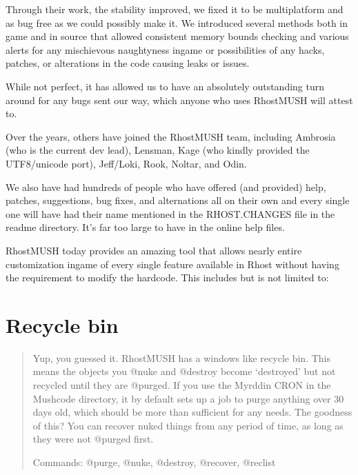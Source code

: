 \documentclass[letterpaper,10pt,english]{sphinxmanual}
\begin{document}
\sphinxAtStartPar
Through their work, the stability improved, we fixed it to be multi\sphinxhyphen{}platform
and as bug free as we could possibly make it.  We introduced several methods both
in game and in source that allowed consistent memory bounds checking and
various alerts for any mischievous naughtyness in\sphinxhyphen{}game or possibilities of any
hacks, patches, or alterations in the code causing leaks or issues.

\sphinxAtStartPar
While not perfect, it has allowed us to have an absolutely outstanding
turn around for any bugs sent our way, which anyone who uses RhostMUSH will
attest to.

\sphinxAtStartPar
Over the years, others have joined the RhostMUSH team, including Ambrosia
(who is the current dev lead), Lensman, Kage (who kindly provided the
UTF8/unicode port), Jeff/Loki, Rook, Noltar, and Odin.

\sphinxAtStartPar
We also have had hundreds of people who have offered (and provided) help,
patches, suggestions, bug fixes, and alternations all on their own and
every single one will have had their name mentioned in the RHOST.CHANGES
file in the readme directory.  It’s far too large to have in the online
help files.

\sphinxAtStartPar
RhostMUSH today provides an amazing tool that allows nearly entire
customization in\sphinxhyphen{}game of every single feature available in Rhost without
having the requirement to modify the hardcode.  This includes but is
not limited to:


\section{Recycle bin}
\label{\detokenize{features:recycle-bin}}\begin{quote}

\sphinxAtStartPar
Yup, you guessed it.  RhostMUSH has a windows like recycle bin.
This means the objects you @nuke and @destroy become ‘destroyed’
but not recycled until they are @purged.  If you use the Myrddin
CRON in the Mushcode directory, it by default sets up a job
to purge anything over 30 days old, which should be more than
sufficient for any needs.  The goodness of this?  You can recover
nuked things from any period of time, as long as they were not
@purged first.

\sphinxAtStartPar
Commands: @purge, @nuke, @destroy, @recover, @reclist
\end{quote}
\end{document}
